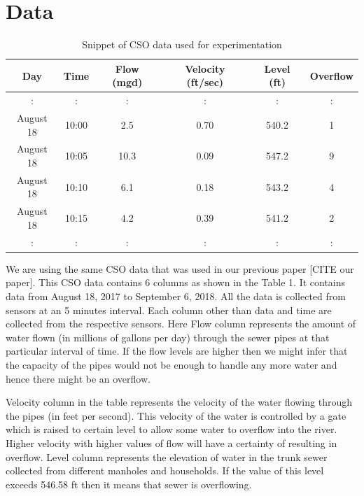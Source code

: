 \documentclass[sigconf,authordraft]{acmart}
\begin{document}
\section{Data}
\begin{table}%
  \caption{Snippet of CSO data used for experimentation}
  \label{tab:freq}
 \begin{tabular}{||c c c c c c||} 
    \toprule
    Day &Time& Flow (mgd)&Velocity (ft/sec)&Level (ft)&Overflow\\
     \midrule
     : & : & : &: & : &:\\
    August 18 &10:00 & 2.5 &0.70 & 540.2 & 1\\
    August 18 &10:05 & 10.3 &0.09 & 547.2 & 9\\
    August 18 &10:10 & 6.1 &0.18 & 543.2 & 4\\
    August 18 &10:15 & 4.2 &0.39 & 541.2 & 2\\
    : & : & : &: & : &:\\
  \bottomrule
\end{tabular}
\end{table}

We are using the same CSO data that was used in our previous paper [CITE our paper]. This CSO data contains 6 columns as shown in the Table 1. It contains data from August 18, 2017 to September 6, 2018. All the data is collected from sensors at an 5 minutes interval. Each column other than data and time are collected from the respective sensors. Here Flow column represents the amount of water flown (in millions of gallons per day) through the sewer pipes at that particular interval of time. If the flow levels are higher then we might infer that the capacity of the pipes would not be enough to handle any more water and hence there might be an overflow.

Velocity column in the table represents the velocity of the water flowing through the pipes (in feet per second). This velocity of the water is controlled by a gate which is raised to certain level to allow some water to overflow into the river. Higher velocity with higher values of flow will have a certainty of resulting in overflow. Level column represents the elevation of water in the trunk sewer collected from different manholes and households. If the value of this level exceeds 546.58 ft then it means that sewer is overflowing.
\end{document}
